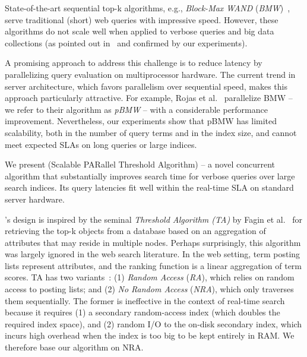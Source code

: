 State-of-the-art sequential top-k  algorithms, 
e.g., \emph{Block-Max WAND} ({\em BMW})~\cite{Ding:2011}, serve traditional (short) web queries with impressive speed. 
However, these algorithms do not scale well when applied to verbose queries
and big data collections (as pointed out in~\cite{Bortnikov:2017} and confirmed by our experiments). 

A promising approach to address this challenge is to reduce latency by
parallelizing query evaluation on multiprocessor hardware. 
The current trend in server architecture, which favors parallelism over sequential speed, makes this approach particularly attractive. 
For example, Rojas et al.~\cite{rojas2013efficient} parallelize BMW -- we refer 
to their  algorithm as \emph{pBMW} -- with a considerable performance improvement.
Nevertheless, our experiments show that pBMW has limited scalability, both in the number of query terms and in the index size,
and cannot meet expected SLAs on long queries or large indices. 

We present \emph{\alg} (Scalable PARallel Threshold Algorithm) -- a novel 
concurrent algorithm that substantially improves search time for verbose queries over large search indices. Its
 query latencies fit well within the real-time SLA on standard  server hardware. 

\alg's design is inspired by the seminal \emph{Threshold Algorithm (TA)} by Fagin et al.~\cite{Fagin:2003} for retrieving the top-k objects from a database based on an aggregation of attributes that may reside in multiple nodes. Perhaps surprisingly, this algorithm was largely ignored in the web search literature.
In the web setting, term posting lists represent attributes, and the ranking function is a linear aggregation of term scores. TA has two variants~\cite{Fagin:2003}: (1) \emph{Random Access} ({\em RA}), which  
 relies on random access to  posting lists; 
and (2) \emph{No Random Access} ({\em NRA}), which 
 only traverses them sequentially. The former is ineffective in the context of real-time search 
because it requires (1)  a secondary random-access index (which doubles the required index space), 
and (2) random I/O to the on-disk secondary index, which incurs high overhead when the index  is too big to be 
kept entirely in RAM. We therefore base our algorithm on  NRA. 




